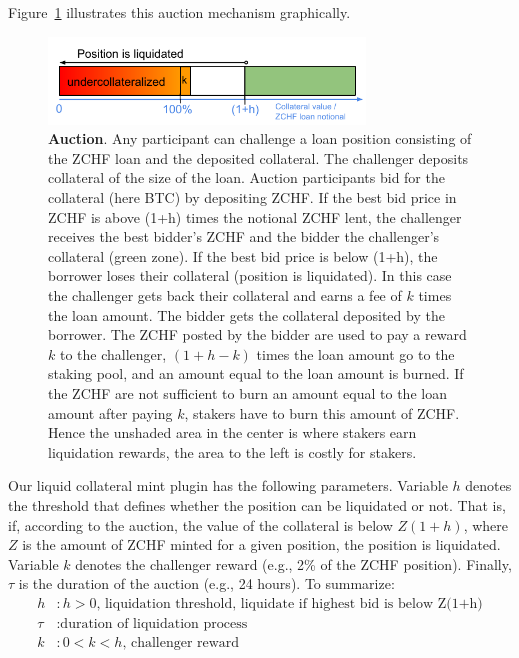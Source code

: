 \documentclass[english,11pt]{article}
\begin{document}
Figure~\ref{fig:auction} illustrates this auction mechanism graphically.
\begin{figure}[h]
    \center
    \includegraphics[width=0.75\textwidth]{auction.pdf}
    \caption{\textbf{Auction}. Any participant can challenge a
    loan position consisting of the ZCHF loan and the deposited collateral.
    The challenger deposits collateral of the size of the loan.
    Auction participants bid for the collateral (here BTC) by depositing ZCHF. 
    If the best bid price in ZCHF is above (1+h) times the notional ZCHF lent,
    the challenger receives the best bidder's ZCHF and the bidder the challenger's
    collateral (green zone). If the best bid price is below (1+h),
    the borrower loses their collateral (position is liquidated).
    In this case the challenger gets back their collateral and earns a fee of
    $k$ times the loan amount. The bidder gets the collateral deposited
    by the borrower. The ZCHF posted by the bidder are used to
    pay a reward $k$ to the challenger, $(1+h-k)$ times the loan amount 
    go to the staking pool, and an amount equal to the loan 
    amount is burned. If the ZCHF are not sufficient to burn
    an amount equal to the loan amount after paying $k$, stakers have
    to burn this amount of ZCHF. Hence the unshaded area
    in the center is where stakers earn liquidation rewards,
    the area to the left is costly for stakers.}\label{fig:auction}
\end{figure}

Our liquid collateral mint plugin has the following parameters. Variable $h$ denotes the threshold that defines whether the position
can be liquidated or not. That is, if, according to the auction, the value of the collateral is below 
$Z(1+h)$, where $Z$ is the amount of ZCHF minted for a given position, the position is liquidated.
Variable $k$ denotes the challenger reward (e.g., 2\% of the ZCHF position). 
Finally, $\tau$ is the duration of the auction (e.g., 24 hours). To summarize:
\begin{align}
h &: \text{$h>0$, liquidation threshold, liquidate if highest bid is below Z(1+h)}\\
\tau &: \text{duration of liquidation process}\\
k &: \text{$0<k<h$, challenger reward}
\end{align}
\end{document}
